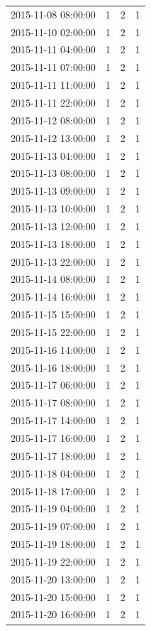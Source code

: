 \begin{tabular}{lrrr}
2015-11-08 08:00:00 & 1 & 2 & 1 \\
2015-11-10 02:00:00 & 1 & 2 & 1 \\
2015-11-11 04:00:00 & 1 & 2 & 1 \\
2015-11-11 07:00:00 & 1 & 2 & 1 \\
2015-11-11 11:00:00 & 1 & 2 & 1 \\
2015-11-11 22:00:00 & 1 & 2 & 1 \\
2015-11-12 08:00:00 & 1 & 2 & 1 \\
2015-11-12 13:00:00 & 1 & 2 & 1 \\
2015-11-13 04:00:00 & 1 & 2 & 1 \\
2015-11-13 08:00:00 & 1 & 2 & 1 \\
2015-11-13 09:00:00 & 1 & 2 & 1 \\
2015-11-13 10:00:00 & 1 & 2 & 1 \\
2015-11-13 12:00:00 & 1 & 2 & 1 \\
2015-11-13 18:00:00 & 1 & 2 & 1 \\
2015-11-13 22:00:00 & 1 & 2 & 1 \\
2015-11-14 08:00:00 & 1 & 2 & 1 \\
2015-11-14 16:00:00 & 1 & 2 & 1 \\
2015-11-15 15:00:00 & 1 & 2 & 1 \\
2015-11-15 22:00:00 & 1 & 2 & 1 \\
2015-11-16 14:00:00 & 1 & 2 & 1 \\
2015-11-16 18:00:00 & 1 & 2 & 1 \\
2015-11-17 06:00:00 & 1 & 2 & 1 \\
2015-11-17 08:00:00 & 1 & 2 & 1 \\
2015-11-17 14:00:00 & 1 & 2 & 1 \\
2015-11-17 16:00:00 & 1 & 2 & 1 \\
2015-11-17 18:00:00 & 1 & 2 & 1 \\
2015-11-18 04:00:00 & 1 & 2 & 1 \\
2015-11-18 17:00:00 & 1 & 2 & 1 \\
2015-11-19 04:00:00 & 1 & 2 & 1 \\
2015-11-19 07:00:00 & 1 & 2 & 1 \\
2015-11-19 18:00:00 & 1 & 2 & 1 \\
2015-11-19 22:00:00 & 1 & 2 & 1 \\
2015-11-20 13:00:00 & 1 & 2 & 1 \\
2015-11-20 15:00:00 & 1 & 2 & 1 \\
2015-11-20 16:00:00 & 1 & 2 & 1 \\

\end{tabular}
